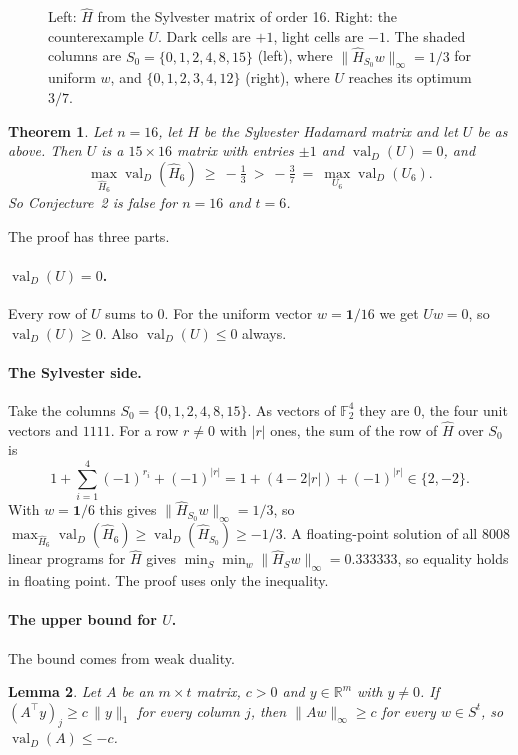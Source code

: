 \documentclass[11pt]{article}
\newtheorem{theorem}{Theorem}
\newtheorem{lemma}[theorem]{Lemma}
\theoremstyle{remark}
\newcommand{\valD}{\operatorname{val}_D}
\newcommand{\Hh}{\hat H}
\begin{document}
\begin{figure}[t]
\centering

\caption{Left: $\Hh$ from the Sylvester matrix of order 16. Right: the counterexample $U$.
Dark cells are $+1$, light cells are $-1$. The shaded columns are $S_0=\{0,1,2,4,8,15\}$
(left), where $\|\Hh_{S_0}w\|_\infty=1/3$ for uniform $w$, and $\{0,1,2,3,4,12\}$ (right),
where $U$ reaches its optimum $3/7$.}
\label{fig:matrices}
\end{figure}

\begin{theorem}\label{thm:main}
Let $n=16$, let $H$ be the Sylvester Hadamard matrix and let $U$ be as above. Then $U$ is
a $15\times16$ matrix with entries $\pm1$ and $\valD(U)=0$, and
\[
  \max_{\Hh_6}\valD(\Hh_6)\ \ge\ -\tfrac13\ >\ -\tfrac37\ =\ \max_{U_6}\valD(U_6).
\]
So Conjecture~2 is false for $n=16$ and $t=6$.
\end{theorem}

The proof has three parts.

\paragraph{$\valD(U)=0$.} Every row of $U$ sums to 0. For the uniform vector
$w=\mathbf 1/16$ we get $Uw=0$, so $\valD(U)\ge0$. Also $\valD(U)\le0$ always.

\paragraph{The Sylvester side.} Take the columns $S_0=\{0,1,2,4,8,15\}$. As vectors of
$\mathbb F_2^4$ they are $0$, the four unit vectors and $1111$. For a row $r\ne0$ with $|r|$
ones, the sum of the row of $\Hh$ over $S_0$ is
\[
  1+\textstyle\sum_{i=1}^4(-1)^{r_i}+(-1)^{|r|}=1+(4-2|r|)+(-1)^{|r|}\in\{2,-2\}.
\]
With $w=\mathbf 1/6$ this gives $\|\Hh_{S_0}w\|_\infty=1/3$, so
$\max_{\Hh_6}\valD(\Hh_6)\ge\valD(\Hh_{S_0})\ge-1/3$. A floating-point solution of all
8008 linear programs for $\Hh$ gives $\min_{S}\min_w\|\Hh_S w\|_\infty=0.333333$, so
equality holds in floating point. The proof uses only the inequality.

\paragraph{The upper bound for $U$.} The bound comes from weak duality.

\begin{lemma}\label{lem:dual}
Let $A$ be an $m\times t$ matrix, $c>0$ and $y\in\mathbb R^m$ with $y\ne0$. If
$(A^\top y)_j\ge c\,\|y\|_1$ for every column $j$, then $\|Aw\|_\infty\ge c$ for every
$w\in S^t$, so $\valD(A)\le-c$.
\end{lemma}
\end{document}
